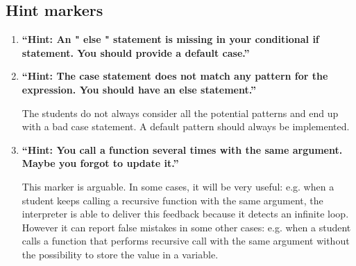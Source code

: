 \documentclass[11pt,a4paper,twoside,openright]{report}
\begin{document}
\subsection{Hint markers}
\begin{enumerate}

\item \textbf{\enquote{Hint: An " else " statement is missing in your conditional if 
statement. You should provide a default case.}}

\item \textbf{\enquote{Hint: The case statement does not match any pattern for the 
expression. You should have an else statement.}} 

The students do not always consider all the potential patterns and end up with a 
bad case statement. A default pattern should always be implemented.

\item \textbf{\enquote{Hint: You call a function several times with the same 
argument. Maybe you forgot to update it.}} 

This marker is arguable. In some cases, it will be very useful: e.g. when a 
student keeps calling a recursive function with the same argument, the 
interpreter is able to deliver this feedback because it detects an infinite 
loop. However it can report false mistakes in some other cases: e.g. when a 
student calls a function that performs recursive call with the same argument without the 
possibility to store the value in a variable.


\end{enumerate}
\end{document}
